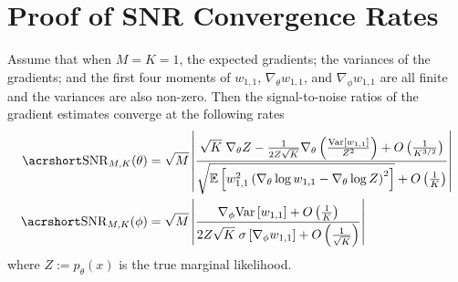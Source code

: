 
\section{Proof of SNR Convergence Rates}
\label{sec:proof}

\begin{theoremApp}
	\label{the:app:snr}
	Assume that when $M=K=1$, the expected gradients; the variances of the gradients; and the 
	first four moments of  $w_{1,1}$, $\nabla_{\theta} w_{1,1}$, and 
	$\nabla_{\phi} w_{1,1}$ are all finite and the variances are
	also non-zero.
	Then the signal-to-noise ratios of the gradient estimates converge at the following rates
	\begin{align}
	\SNR_{M,K} (\theta) &= 
	\sqrt{M}\left|\frac{ \sqrt{K} \; 
		\nabla_{\theta} Z -\frac{1}{2Z\sqrt{K}}\nabla_{\theta} \left(\frac{\textnormal{Var} \left[w_{1,1}\right]}{Z^2}\right)+ O\left(\frac{1}{K^{3/2}}\right) }
	{\sqrt{\E \left[w_{1,1}^2\left(\nabla_{\theta} \log w_{1,1}-\nabla_{\theta} \log Z\right)^2\right]} + O\left(\frac{1}{K}\right)}\right| \\
	\SNR_{M,K} (\phi) & =\sqrt{M} \left|\frac{
		\nabla_{\phi} \textnormal{Var} \left[w_{1,1}\right] + O\left(\frac{1}{K}\right) }
	{2 Z\sqrt{K} \; \sigma\left[\nabla_{\phi} w_{1,1}\right] +O\left(\frac{1}{\sqrt{K}}\right)}\right|
	\end{align}
	where $Z := p_{\theta}(x)$ is the true marginal likelihood.
\end{theoremApp}

